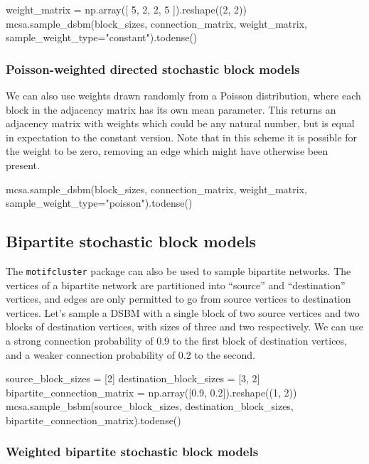 \documentclass{article}
\begin{document}
\begin{pyconsole}
weight_matrix = np.array([
  5, 2,
  2, 5
]).reshape((2, 2))
mcsa.sample_dsbm(block_sizes, connection_matrix, weight_matrix,
  sample_weight_type="constant").todense()
\end{pyconsole}

\subsubsection{Poisson-weighted directed stochastic block models}

We can also use weights drawn randomly from a Poisson distribution,
where each block in the adjacency matrix has its own mean parameter.
This returns an adjacency matrix with weights which could be any natural
number, but is equal in expectation to the constant version.
Note that in this scheme it is possible for the weight to be zero,
removing an edge which might have otherwise been present.

\begin{pyconsole}
mcsa.sample_dsbm(block_sizes, connection_matrix, weight_matrix,
  sample_weight_type="poisson").todense()
\end{pyconsole}

\pagebreak

\subsection{Bipartite stochastic block models}

The \texttt{motifcluster} package can also be used to sample
bipartite networks.
The vertices of a bipartite network are partitioned
into ``source'' and ``destination'' vertices,
and edges are only permitted to go from source vertices
to destination vertices.
Let's sample a DSBM with a single block of two source vertices
and two blocks of destination vertices, with
sizes of three and two respectively.
We can use a strong connection probability of 0.9 to the first block of
destination vertices,
and a weaker connection probability of 0.2 to the second.

\begin{pyconsole}
source_block_sizes = [2]
destination_block_sizes = [3, 2]
bipartite_connection_matrix = np.array([0.9, 0.2]).reshape((1, 2))
mcsa.sample_bsbm(source_block_sizes, destination_block_sizes,
  bipartite_connection_matrix).todense()
\end{pyconsole}

\subsubsection{Weighted bipartite stochastic block models}
\end{document}
